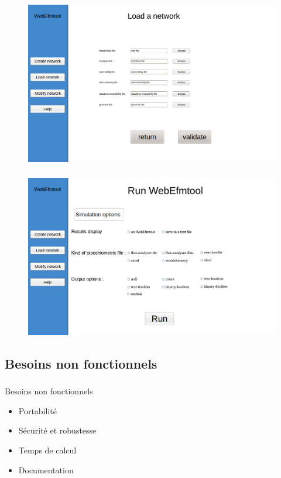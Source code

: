 \documentclass[11pt]{beamer}
\begin{document}
\begin{frame}
	\frametitle{\subsecname}
	\begin{figure}[h]
		\includegraphics[scale=0.25]{Load.png}
	 \end{figure}
\end{frame}

\begin{frame}
	\frametitle{\subsecname}
	\begin{figure}[h]
		\includegraphics[scale=0.25]{Run.png}
	 \end{figure}
\end{frame}

\subsection{Besoins non fonctionnels}

\begin{frame}
	\frametitle{\subsecname}
	\begin{block}{Besoins non fonctionnels}
		\begin{itemize}
		\item Portabilité
		\item Sécurité et robustesse
		\item Temps de calcul
		\item Documentation
		\end{itemize}
	\end{block}
\end{frame}
\end{document}
